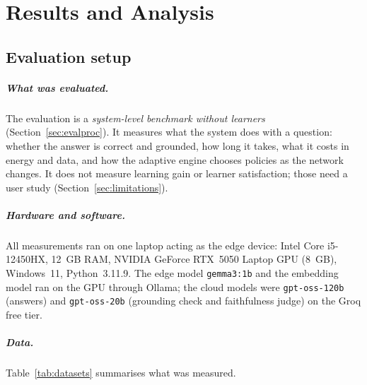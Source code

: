 \chapter{Results and Analysis}
\label{ch:results}

\section{Evaluation setup}
\label{sec:setup}

\paragraph{What was evaluated.} The evaluation is a \emph{system-level benchmark without learners}
(Section~\ref{sec:evalproc}). It measures what the system does with a question: whether the answer is
correct and grounded, how long it takes, what it costs in energy and data, and how the adaptive engine
chooses policies as the network changes. It does not measure learning gain or learner satisfaction; those
need a user study (Section~\ref{sec:limitations}).

\paragraph{Hardware and software.} All measurements ran on one laptop acting as the edge device: Intel
Core i5-12450HX, 12~GB RAM, NVIDIA GeForce RTX~5050 Laptop GPU (8~GB), Windows~11, Python~3.11.9. The edge
model \texttt{gemma3:1b} and the embedding model ran on the GPU through Ollama; the cloud models were
\texttt{gpt-oss-120b} (answers) and \texttt{gpt-oss-20b} (grounding check and faithfulness judge) on the
Groq free tier.

\paragraph{Data.} Table~\ref{tab:datasets} summarises what was measured.

